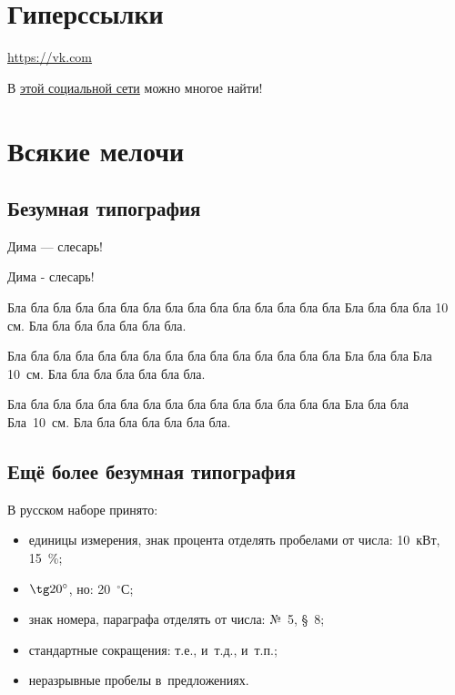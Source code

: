\documentclass[12pt, a4paper]{article}
\begin{document}
\section{Гиперссылки}

\url{https://vk.com}

В \href{https://vk.com}{этой социальной сети} можно многое найти!

\section{Всякие мелочи}

\subsection{Безумная типография}

Дима --- слесарь!

Дима - слесарь!


Бла бла бла бла бла бла бла бла бла бла бла бла бла бла бла Бла бла бла бла 10 см. Бла бла бла бла бла бла бла.

\vspace{2mm}

Бла бла бла бла бла бла бла бла бла бла бла бла бла бла бла Бла бла бла Бла  10~см. Бла бла бла бла бла бла бла.

\vspace{2mm}

Бла бла бла бла бла бла бла бла бла бла бла бла бла бла бла Бла бла бла Бла~10~см. Бла бла бла бла бла бла бла.


\subsection{Ещё более безумная типография}



В русском наборе принято:
\begin{itemize}
   \item единицы измерения, знак процента отделять пробелами от числа: 10~кВт, 15~\%;
   \item $\tg 20^\circ$, но: 20~${}^\circ$С;
   \item знак номера, параграфа отделять от числа: №~5, \S~8;
   \item стандартные сокращения: т.\:е., и~т.\:д., и~т.\:п.;
   \item неразрывные пробелы в~предложениях.
\end{itemize}
\end{document}
